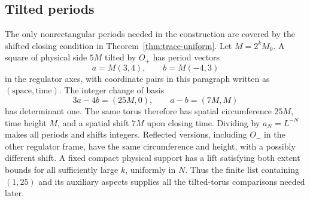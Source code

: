 \subsection{Tilted periods}

The only nonrectangular periods needed in the construction are covered
by the shifted closing condition in Theorem~\ref{thm:trace-uniform}.
Let $M=2^kM_0$.  A square of physical side $5M$ tilted by $O_+$ has
period vectors
\[
 a=M(3,4),\qquad b=M(-4,3)
\]
in the regulator axes, with coordinate pairs in this paragraph written
as $(\mathrm{space},\mathrm{time})$.  The integer change of basis
\[
 3a-4b=(25M,0),\qquad a-b=(7M,M)
\]
has determinant one.  The same torus therefore has spatial
circumference $25M$, time height $M$, and a spatial shift $7M$ upon
closing time.  Dividing by $a_N=L^{-N}$ makes all periods and shifts
integers.  Reflected versions, including $O_-$ in the other regulator
frame, have the same circumference and height, with a possibly
different shift.  A fixed compact physical support has a lift satisfying
both extent bounds for all sufficiently large $k$, uniformly in $N$.
Thus the finite list containing
$(1,25)$ and its auxiliary aspects supplies all the tilted-torus
comparisons needed later.
